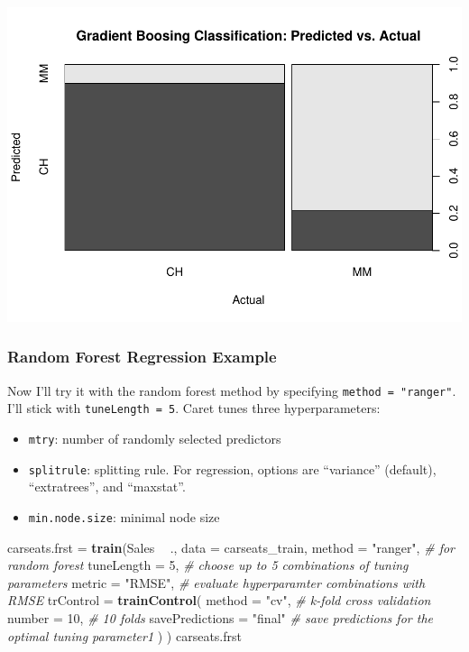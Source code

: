 \documentclass[
]{book}
\newenvironment{Shaded}{\begin{snugshade}}{\end{snugshade}}
\newcommand{\CommentTok}[1]{\textcolor[rgb]{0.56,0.35,0.01}{\textit{#1}}}
\newcommand{\DataTypeTok}[1]{\textcolor[rgb]{0.13,0.29,0.53}{#1}}
\newcommand{\DecValTok}[1]{\textcolor[rgb]{0.00,0.00,0.81}{#1}}
\newcommand{\KeywordTok}[1]{\textcolor[rgb]{0.13,0.29,0.53}{\textbf{#1}}}
\newcommand{\NormalTok}[1]{#1}
\newcommand{\OperatorTok}[1]{\textcolor[rgb]{0.81,0.36,0.00}{\textbf{#1}}}
\newcommand{\StringTok}[1]{\textcolor[rgb]{0.31,0.60,0.02}{#1}}
\providecommand{\tightlist}{%
  \setlength{\itemsep}{0pt}\setlength{\parskip}{0pt}}
\begin{document}
\includegraphics{data-sci_files/figure-latex/unnamed-chunk-86-2.pdf}

\hypertarget{random-forest-regression-example}{%
\subsubsection{Random Forest Regression Example}\label{random-forest-regression-example}}

Now I'll try it with the random forest method by specifying \texttt{method\ =\ "ranger"}. I'll stick with \texttt{tuneLength\ =\ 5}. Caret tunes three hyperparameters:

\begin{itemize}
\tightlist
\item
  \texttt{mtry}: number of randomly selected predictors
\item
  \texttt{splitrule}: splitting rule. For regression, options are ``variance'' (default), ``extratrees'', and ``maxstat''.
\item
  \texttt{min.node.size}: minimal node size
\end{itemize}

\begin{Shaded}
\begin{Highlighting}[]
\NormalTok{carseats.frst =}\StringTok{ }\KeywordTok{train}\NormalTok{(Sales }\OperatorTok{~}\StringTok{ }\NormalTok{., }
               \DataTypeTok{data =}\NormalTok{ carseats_train, }
               \DataTypeTok{method =} \StringTok{"ranger"}\NormalTok{,  }\CommentTok{# for random forest}
               \DataTypeTok{tuneLength =} \DecValTok{5}\NormalTok{,  }\CommentTok{# choose up to 5 combinations of tuning parameters}
               \DataTypeTok{metric =} \StringTok{"RMSE"}\NormalTok{,  }\CommentTok{# evaluate hyperparamter combinations with RMSE}
               \DataTypeTok{trControl =} \KeywordTok{trainControl}\NormalTok{(}
                 \DataTypeTok{method =} \StringTok{"cv"}\NormalTok{,  }\CommentTok{# k-fold cross validation}
                 \DataTypeTok{number =} \DecValTok{10}\NormalTok{,  }\CommentTok{# 10 folds}
                 \DataTypeTok{savePredictions =} \StringTok{"final"}       \CommentTok{# save predictions for the optimal tuning parameter1}
\NormalTok{                 )}
\NormalTok{               )}
\NormalTok{carseats.frst}
\end{Highlighting}
\end{Shaded}
\end{document}

